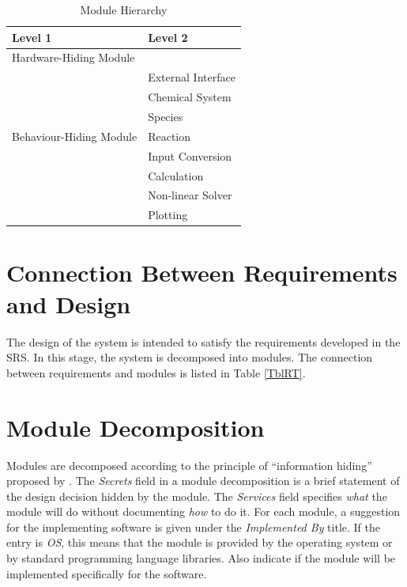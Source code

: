 \documentclass[12pt, titlepage]{article}
\begin{document}
\begin{table}[h!]
\centering
\begin{tabular}{p{} p{}}
\toprule
\textbf{Level 1} & \textbf{Level 2}\\
\midrule

{Hardware-Hiding Module} & ~ \\
\midrule

\multirow{7}{0.3\textwidth}{Behaviour-Hiding Module} & External Interface\\
& Chemical System\\
& Species\\
& Reaction\\
& Input Conversion\\
& Calculation\\
\midrule

\multirow{2}{0.3\textwidth}{Software Decision} & Non-linear Solver\\
& Plotting\\
\bottomrule

\end{tabular}
\caption{Module Hierarchy}
\label{TblMH}
\end{table}

\section{Connection Between Requirements and Design} \label{SecConnection}

The design of the system is intended to satisfy the requirements developed in
the SRS. In this stage, the system is decomposed into modules. The connection
between requirements and modules is listed in Table \ref{TblRT}.

\section{Module Decomposition} \label{SecMD}

Modules are decomposed according to the principle of ``information hiding''
proposed by \citet{ParnasEtAl1984}. The \emph{Secrets} field in a module
decomposition is a brief statement of the design decision hidden by the
module. The \emph{Services} field specifies \emph{what} the module will do
without documenting \emph{how} to do it. For each module, a suggestion for the
implementing software is given under the \emph{Implemented By} title. If the
entry is \emph{OS}, this means that the module is provided by the operating
system or by standard programming language libraries.  Also indicate if the
module will be implemented specifically for the software.
\end{document}
